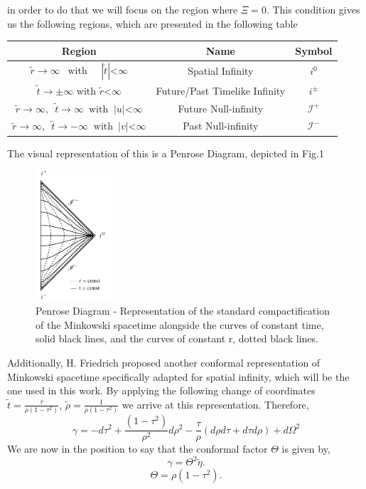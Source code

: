 \documentclass[
11pt, %
english, %
singlespacing, %
headsepline, %
]{MastersDoctoralThesis} %
\begin{document}
in order to do that we will focus on the region where $\Xi = 0$. This
condition gives us the following regions, which are presented in the
following table
\begin{center}
\begin{tabular}{ |c|c|c| }
  \hline
  Region & Name & Symbol \\
 \hline
 $\tilde{r} \rightarrow \infty \enspace \;  \text{with} \; \;\;\;\;
 |\tilde{t}| $<$ \infty$ & Spatial Infinity & $i^{0}$ \\
 \hline 
 $\tilde{t} \rightarrow \pm \infty$  \;\; with \;\; $\tilde{r}$<$\infty$
 \enspace & Future/Past Timelike Infinity & $i^{\pm}$ \\
 \hline
 $\tilde{r} \rightarrow \infty, \enspace \tilde{t} \rightarrow \infty \enspace
 \text{with} \;\; |u|$<$\infty$ &  Future Null-infinity & $\mathscr{I}^+$ \\ 
 \hline
 $\tilde{r} \rightarrow\infty, \enspace \tilde{t} \rightarrow-\infty \;\;
 \text{with} \enspace |v|$<$\infty$ & Past Null-infinity & $\mathscr{I}^-$ \\
 \hline
\end{tabular}
\end{center}
The visual representation of this is a Penrose Diagram, depicted in
Fig.1
\begin{figure}[h]
	\centering \includegraphics[width =0.25\textwidth]{Penrose diagram.pdf}
    \caption{Penrose Diagram - Representation of the standard
      compactification of the Minkowski spacetime alongside the curves of constant
      time, solid black lines, and the curves of constant r, dotted
      black lines.}
\end{figure}
Additionally, H. Friedrich proposed another conformal
representation of Minkowski spacetime specifically adapted for
spatial infinity, which will be the one used in this work. By applying
the following change of coordinates $\tilde{t} =
\frac{\tau}{\rho(1-\tau^{2})}$, \enspace $\tilde{\rho} =
\frac{1}{\rho(1-\tau^{2})}$ we arrive at this representation.
Therefore,
$$ \gamma=-d \tau^2+\frac{\left(1-\tau^2\right)}{\rho^2} d
\rho^2-\frac{\tau}{\rho}(d \rho d \tau+d \tau d \rho)+d \Omega^2 $$ We
are now in the position to say that the conformal factor $\Theta$ is
given by,
\begin{equation}\label{eq:gamma}
	\gamma = \Theta^2 \tilde{\eta}.
\end{equation}
\begin{equation}\label{eq:conf-factor}
	\Theta = \rho(1-\tau^2).
\end{equation}
\end{document}
